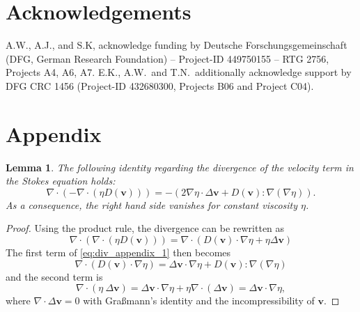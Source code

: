 \documentclass[final,leqno]{scrarticle}
\newtheorem{lemma}[theorem]{Lemma}
\begin{document}
\section{Acknowledgements}\label{sec:acknowledgments}
A.W., A.J., and S.K, acknowledge funding by Deutsche Forschungsgemeinschaft (DFG, German Research Foundation) – Project-ID 449750155 – RTG 2756, Projects A4, A6, A7.
E.K., A.W.~and T.N.~additionally acknowledge support by DFG CRC 1456 (Project-ID 432680300, Projects B06 and Project C04).





\appendix
\section{Appendix}

\begin{lemma}\label{lemma:div_appendix}
The following identity regarding the divergence of the velocity term in the Stokes equation holds:
    \begin{displaymath}
        \nabla \cdot ( -  \nabla \cdot (\eta D(\mathbf{v}))) 
        = - \left( 2 \nabla \eta \cdot \Delta \mathbf{v} + D(\mathbf{v}) : \nabla(\nabla\eta) \right).
    \end{displaymath}
    As a consequence, the right hand side vanishes for constant viscosity $\eta$.
\end{lemma}
\begin{proof}
Using the product rule, the divergence can be rewritten as
    \begin{equation}\label{eq:div_appendix_1}
    \nabla \cdot (\nabla \cdot (\eta D(\mathbf{v})) )
     = \nabla \cdot ( D(\mathbf{v}) \cdot \nabla \eta   + \eta \Delta \mathbf{v} )
    \end{equation}
The first term of \eqref{eq:div_appendix_1} then becomes
\begin{displaymath}
    \nabla \cdot (D(\mathbf{v}) \cdot \nabla \eta   ) 
= \Delta \mathbf{v} \cdot \nabla \eta  + D(\mathbf{v}) : \nabla (\nabla \eta) 
\end{displaymath}
and the second term is 
\begin{displaymath}
    \nabla \cdot ( \eta \ \Delta \mathbf{v} ) 
= \Delta \mathbf{v} \cdot \nabla \eta + \eta \nabla \cdot ( \Delta \mathbf{v}) 
=  \Delta \mathbf{v} \cdot \nabla \eta ,
\end{displaymath}
where $ \nabla \cdot \Delta \mathbf{v}  = 0$ with Graßmann's identity and the incompressibility of $\mathbf{v}$. 
\end{proof}

\vspace*{2ex}




\pagestyle{myheadings}
\thispagestyle{plain}
\end{document}
